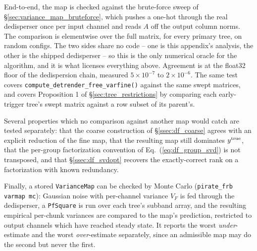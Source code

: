 \documentclass{article}
\numberwithin{equation}{section}   %
\begin{document}
End-to-end, the map is checked against the brute-force sweep of
\S\ref{sec:variance_map_bruteforce}, which pushes a one-hot through the real dedisperser once per
input channel and reads $A$ off the output column norms. The comparison is elementwise over the
full matrix, for every primary tree, on random configs. The two sides share no code -- one is
this appendix's analysis, the other is the shipped dedisperser -- so this is the only numerical
oracle for the algorithm, and it is what licenses everything above. Agreement is at the float32
floor of the dedispersion chain, measured $5 \times 10^{-7}$ to $2 \times 10^{-6}$. The same test
covers \verb|compute_detrender_free_varfine()| against the same swept matrices, and covers
Proposition 1 of \S\ref{sec:tree_restrictions} by comparing each early-trigger tree's swept matrix
against a row subset of its parent's.

Several properties which no comparison against another map would catch are tested separately:
that the coarse construction of \S\ref{ssec:df_coarse} agrees with an explicit reduction of the
fine map, that the resulting map still dominates $y^{\rm true}$, that the per-group
factorization convention of Eq.\ (\ref{eq:df_group_svd}) is not transposed, and that
\S\ref{ssec:df_svdopt} recovers the exactly-correct rank on a factorization with known
redundancy.

Finally, a stored \verb|VarianceMap| can be checked by Monte Carlo
({\tt pirate\_frb varmap mc}): Gaussian noise with per-channel variance $V_F$ is fed through the
dedisperser, a {\tt PfSquare} is run over each tree's subband array, and the resulting empirical
per-chunk variances are compared to the map's prediction, restricted to output channels which
have reached steady state. It reports the worst {\em under}-estimate and the worst
{\em over}-estimate separately, since an admissible map may do the second but never the first.
\end{document}
